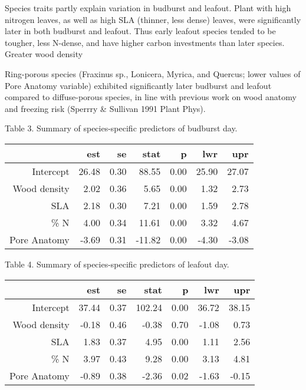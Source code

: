 \documentclass[11pt]{article}
\begin{document}
Species traits partly explain variation in budburst and leafout. Plant with high nitrogen leaves, as well as high SLA (thinner, less dense) leaves, were significantly later in both budburst and leafout. Thus early leafout species tended to be tougher, less N-dense, and have higher carbon investments than later species. Greater wood density

Ring-porous species (Fraxinus sp., Lonicera, Myrica, and Quercus; lower values of Pore Anatomy variable) exhibited significantly later budburst and leafout compared to diffuse-porous species, in line with previous work on wood anatomy and freezing risk (Sperrry \& Sullivan 1991 Plant Phys).


Table 3. Summary of species-specific predictors of budburst day. 
\begin{table}[ht]
\centering
\begin{tabular}{rrrrrrr}
  \hline
 & est & se & stat & p & lwr & upr \\ 
  \hline
Intercept & 26.48 & 0.30 & 88.55 & 0.00 & 25.90 & 27.07 \\ 
  Wood density & 2.02 & 0.36 & 5.65 & 0.00 & 1.32 & 2.73 \\ 
  SLA & 2.18 & 0.30 & 7.21 & 0.00 & 1.59 & 2.78 \\ 
  \% N & 4.00 & 0.34 & 11.61 & 0.00 & 3.32 & 4.67 \\ 
  Pore Anatomy & -3.69 & 0.31 & -11.82 & 0.00 & -4.30 & -3.08 \\ 
   \hline
\end{tabular}
\end{table}

Table 4. Summary of species-specific predictors of leafout day. 
\begin{table}[ht]
\centering
\begin{tabular}{rrrrrrr}
  \hline
 & est & se & stat & p & lwr & upr \\ 
  \hline
 Intercept & 37.44 & 0.37 & 102.24 & 0.00 & 36.72 & 38.15 \\ 
  Wood density & -0.18 & 0.46 & -0.38 & 0.70 & -1.08 & 0.73 \\ 
  SLA & 1.83 & 0.37 & 4.95 & 0.00 & 1.11 & 2.56 \\ 
  \% N & 3.97 & 0.43 & 9.28 & 0.00 & 3.13 & 4.81 \\ 
Pore Anatomy & -0.89 & 0.38 & -2.36 & 0.02 & -1.63 & -0.15 \\ 
   \hline
\end{tabular}
\end{table}
\end{document}
